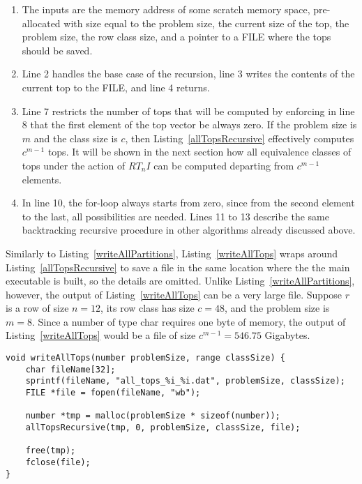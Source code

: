 \begin{enumerate}
\item The inputs are the memory address of some scratch memory space, pre-allocated with size equal to the problem size, the current size of the top, the problem size, the row class size, and a pointer to a FILE where the tops should be saved.
\pagebreak
\item Line 2 handles the base case of the recursion, line 3 writes the contents of the current top to the FILE, and line 4 returns.
\addtocounter{enumi}{4}
\item Line 7 restricts the number of tops that will be computed by enforcing in line 8 that the first element of the top vector be always zero. If the problem size is $m$ and the class size is $c$, then Listing~\ref{allTopsRecursive} effectively computes $c^{m - 1}$ tops. It will be shown in the next section how all equivalence classes of tops under the action of $RT_nI$ can be computed departing from $c^{m - 1}$ elements.
\addtocounter{enumi}{2}
\item In line 10, the for-loop always starts from zero, since from the second element to the last, all possibilities are needed. Lines 11 to 13 describe the same backtracking recursive procedure in other algorithms already discussed above.
\end{enumerate}

Similarly to Listing~\ref{writeAllPartitions}, Listing~\ref{writeAllTops} wraps around Listing~\ref{allTopsRecursive} to save a file in the same location where the the main executable is built, so the details are omitted. Unlike Listing~\ref{writeAllPartitions}, however, the output of Listing~\ref{writeAllTops} can be a very large file. Suppose $r$ is a row of size $n = 12$, its row class has size $c = 48$, and the problem size is $m = 8$. Since a number of type char requires one byte of memory, the output of Listing~\ref{writeAllTops} would be a file of size $c^{m - 1} = 546.75$ Gigabytes.

\begin{lstlisting}[caption={Writing all tops to a file.},label={writeAllTops}]
void writeAllTops(number problemSize, range classSize) {
    char fileName[32];
    sprintf(fileName, "all_tops_%i_%i.dat", problemSize, classSize);
    FILE *file = fopen(fileName, "wb");

    number *tmp = malloc(problemSize * sizeof(number));
    allTopsRecursive(tmp, 0, problemSize, classSize, file);

    free(tmp);
    fclose(file);
}
\end{lstlisting}

